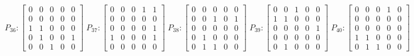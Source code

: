     $$
        P_{36} : \begin{bmatrix}
            0 & 0 & 0 & 0 & 0 \\
            0 & 0 & 0 & 0 & 0 \\
            1 & 1 & 0 & 0 & 0 \\
            0 & 1 & 0 & 0 & 1 \\
            0 & 0 & 1 & 0 & 0
        \end{bmatrix}
        \;
         P_{37} : \begin{bmatrix}
            0 & 0 & 0 & 1 & 1 \\
            0 & 0 & 0 & 0 & 0 \\
            0 & 0 & 0 & 0 & 1 \\
            1 & 0 & 0 & 0 & 1 \\
            0 & 0 & 0 & 0 & 0
        \end{bmatrix}
        \; 
        P_{38} : \begin{bmatrix}
            0 & 0 & 0 & 0 & 0 \\
            0 & 0 & 1 & 0 & 1 \\
            0 & 0 & 0 & 0 & 0 \\
            0 & 1 & 0 & 0 & 0 \\
            0 & 1 & 1 & 0 & 0
        \end{bmatrix}
        \;
        P_{39} : \begin{bmatrix}
            0 & 0 & 1 & 0 & 0 \\
            1 & 1 & 0 & 0 & 0 \\
            0 & 0 & 0 & 0 & 1 \\
            0 & 0 & 0 & 0 & 0 \\
            0 & 1 & 0 & 0 & 0
        \end{bmatrix}
        \;
        P_{40} : \begin{bmatrix}
            0 & 0 & 0 & 1 & 0 \\
            0 & 0 & 0 & 0 & 0 \\
            0 & 0 & 0 & 0 & 0 \\
            1 & 1 & 0 & 0 & 0 \\
            0 & 1 & 1 & 0 & 0
        \end{bmatrix}
    $$


